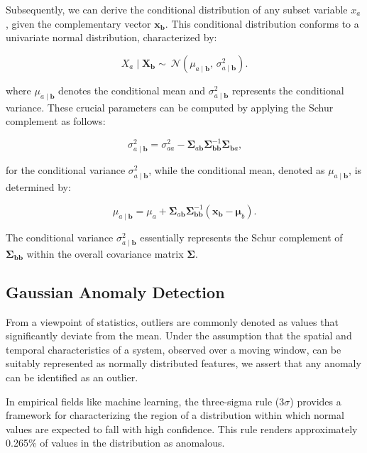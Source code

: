Subsequently, we can derive the conditional distribution of any subset variable $x_a$, given the complementary vector $\boldsymbol{x_b}$. This conditional distribution conforms to a univariate normal distribution, characterized by:

\begin{equation}
  X_a \mid \mathbf{X}_{\boldsymbol{b}} \sim\ \mathcal{N}(\mu_{a \mid \boldsymbol{b}},\, \sigma_{a \mid \boldsymbol{b}}^2)\text{.}\label{eq:cond_distribution}
\end{equation}

where $\mu_{a \mid \boldsymbol{b}}$ denotes the conditional mean and $\sigma_{a \mid \boldsymbol{b}}^2$ represents the conditional variance. These crucial parameters can be computed by applying the Schur complement as follows:

\begin{equation}
  \sigma_{a \mid \boldsymbol{b}}^2 = \sigma_{aa}^2 - \boldsymbol\Sigma_{a\boldsymbol{b}} \boldsymbol\Sigma_{\boldsymbol{bb}}^{-1} \boldsymbol\Sigma_{\boldsymbol{b}a}\text{,}\label{eq:cond_var}
\end{equation}

for the conditional variance $\sigma_{a \mid \boldsymbol{b}}^2$, while the conditional mean, denoted as $\mu_{a \mid \boldsymbol{b}}$, is determined by:

\begin{equation}
  \mu_{a \mid \boldsymbol{b}} = \mu_a + \boldsymbol\Sigma_{a\boldsymbol{b}} \boldsymbol\Sigma_{\boldsymbol{bb}}^{-1} (\boldsymbol{x_b} - \boldsymbol\mu_b)\text{.}\label{eq:cond_mean}
\end{equation}

The conditional variance $\sigma_{a \mid \boldsymbol{b}}^2$ essentially represents the Schur complement of $\boldsymbol\Sigma_{\boldsymbol{bb}}$ within the overall covariance matrix $\boldsymbol\Sigma$.

\subsection{Gaussian Anomaly Detection}\label{AA:Anomaly}
From a viewpoint of statistics, outliers are commonly denoted as values that significantly deviate from the mean. Under the assumption that the spatial and temporal characteristics of a system, observed over a moving window, can be suitably represented as normally distributed features, we assert that any anomaly can be identified as an outlier.

In empirical fields like machine learning, the three-sigma rule ($3\sigma$) provides a framework for characterizing the region of a distribution within which normal values are expected to fall with high confidence. This rule renders approximately 0.265\% of values in the distribution as anomalous.

